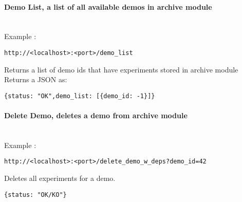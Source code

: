 \paragraph{Demo List, a list of all available demos in archive module} \hspace{0pt} \\
Example :
\begin{verbatim}
http://<localhost>:<port>/demo_list
\end{verbatim}
Returns a list of demo ids that have experiments stored in archive module
Returns a  JSON as:
\begin{verbatim}
{status: "OK",demo_list: [{demo_id: -1}]}
\end{verbatim} 


\paragraph{Delete Demo, deletes a demo from archive module} \hspace{0pt} \\
Example :
\begin{verbatim}
http://<localhost>:<port>/delete_demo_w_deps?demo_id=42
\end{verbatim}
Deletes all experiments for a demo.
\begin{verbatim}
{status: "OK/KO"}
\end{verbatim} 

